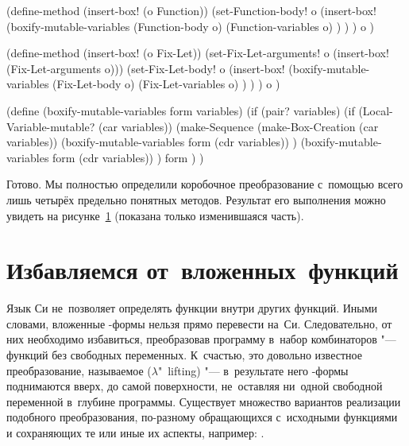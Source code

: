
\begin{code:lisp}
(define-method (insert-box! (o Function))
  (set-Function-body!
   o (insert-box!
      (boxify-mutable-variables (Function-body o)
                                (Function-variables o) ) ) )
  o )

(define-method (insert-box! (o Fix-Let))
  (set-Fix-Let-arguments! o (insert-box! (Fix-Let-arguments o)))
  (set-Fix-Let-body!
   o (insert-box!
      (boxify-mutable-variables (Fix-Let-body o)
                                (Fix-Let-variables o) ) ) )
  o )

(define (boxify-mutable-variables form variables)
  (if (pair? variables)
      (if (Local-Variable-mutable? (car variables))
          (make-Sequence
           (make-Box-Creation (car variables))
           (boxify-mutable-variables form (cdr variables)) )
          (boxify-mutable-variables form (cdr variables)) )
      form ) )
\end{code:lisp}


Готово. Мы полностью определили коробочное преобразование с~помощью всего лишь
четырёх предельно понятных методов. Результат его выполнения можно увидеть на
рисунке~\ref{cc/boxes/pic:result} (показана только изменившаяся часть).

\begin{figure}\centering

\caption{}%
\label{cc/boxes/pic:result}
\end{figure}


\section{Избавляемся от~вложенных~функций}\label{cc/sect:no-nest}

Язык Си не~позволяет определять функции внутри других функций. Иными словами,
вложенные -формы нельзя прямо перевести на~Си. Следовательно, от них
необходимо избавиться, преобразовав программу в~набор комбинаторов "--- функций
без свободных переменных. К~счастью, это довольно известное преобразование,
называемое  ($\lambda$"~lifting) "--- в~результате
него -формы поднимаются вверх, до самой поверхности, не~оставляя
ни~одной свободной переменной в~глубине программы. Существует множество
вариантов реализации подобного преобразования, по-разному обращающихся
с~исходными функциями и сохраняющих те или иные их аспекты, например:
\cite{ws94,kh89,ch94}.

